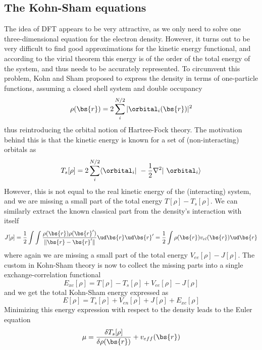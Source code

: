 \subsection{The Kohn-Sham equations}
The idea of DFT appears to be very attractive, as we only need to solve one three-dimensional equation
for the electron density. However, it turns out to be very difficult to find good approximations
for the kinetic energy functional, and according to the virial theorem this energy is of the order of 
the total energy of the system, and thus needs to be accurately represented. To circumvent this 
problem, Kohn and Sham\cite{Kohn-Sham:1965} proposed to express the density in terms of one-particle functions,
assuming a closed shell system and double occupancy
\begin{equation}
    \rho(\bs{r}) = 2 \sum_i^{N/2} | \orbital_i(\bs{r})|^2
\end{equation}
thus reintroducing the orbital notion of Hartree-Fock theory. The motivation behind this is that the
kinetic energy is known for a set of (non-interacting) orbitals as
\begin{equation}
    T_s[\rho] = 2 \sum_i^{N/2} \langle \orbital_i | -\frac{1}{2}\nabla^2 | \orbital_i \rangle
\end{equation}
However, this is not equal to the real kinetic energy of the (interacting) system, and we are missing
a small part of the total energy $T[\rho] - T_s[\rho]$. We can similarly extract the known classical 
part from the density's interaction with itself
\begin{equation}
    J[\rho] = \frac{1}{2}\int\int\frac{\rho(\bs{r})\rho(\bs{r}')}{\|\bs{r}-\bs{r}'\|} \ud\bs{r}\ud\bs{r}' 
	= \frac{1}{2} \int \rho(\bs{r})v_{el}(\bs{r}) \ud \bs{r}
\end{equation}
where again we are missing a small part of the total energy $V_{ee}[\rho] - J[\rho]$. The custom in
Kohn-Sham theory is now to collect the missing parts into a single exchange-correlation functional
\begin{equation}
    E_{xc}[\rho] = T[\rho] - T_s[\rho] + V_{ee}[\rho] - J[\rho]
\end{equation}
and we get the total Kohn-Sham energy expressed as
\begin{equation}
    \label{eq:KS-energy}
    E[\rho] = T_s[\rho] + V_{en}[\rho] + J[\rho] + E_{xc}[\rho]
\end{equation}
Minimizing this energy expression with respect to the density leads to the Euler equation
\begin{equation}
    \label{eq:KS-euler}
    \mu = \frac{\delta T_s[\rho]}{\delta \rho(\bs{r})} + v_{eff}(\bs{r})
\end{equation}
